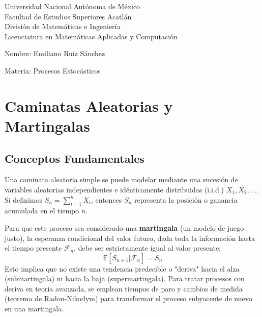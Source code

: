 \documentclass[12pt, a4paper]{article}
\begin{document}
\begin{titlepage}
    \centering
    \vspace{1cm}
    
    Universidad Nacional Autónoma de México \\
    Facultad de Estudios Superiores Acatlán \\
    División de Matemáticas e Ingeniería \\
    Licenciatura en Matemáticas Aplicadas y Computación \\
    \vspace{1.5cm}
    
    Nombre: Emiliano Ruiz Sánchez \\
    \vspace{1.5cm}
            
    Materia: Procesos Estocásticos \\
        
\end{titlepage}

\newpage


\section{Caminatas Aleatorias y Martingalas}

\subsection{Conceptos Fundamentales}
Una caminata aleatoria simple se puede modelar mediante una sucesión de variables aleatorias independientes e idénticamente distribuidas (i.i.d.) $X_1, X_2, \dots$. Si definimos $S_n = \sum_{i=1}^n X_i$, entonces $S_n$ representa la posición o ganancia acumulada en el tiempo $n$. 

Para que este proceso sea considerado una \textbf{martingala} (un modelo de juego justo), la esperanza condicional del valor futuro, dada toda la información hasta el tiempo presente $\mathcal{F}_n$, debe ser estrictamente igual al valor presente:
$$ \mathbb{E}[S_{n+1} | \mathcal{F}_n] = S_n $$
Esto implica que no existe una tendencia predecible o "deriva" hacia el alza (submartingala) ni hacia la baja (supermartingala). Para tratar procesos con deriva en teoría avanzada, se emplean tiempos de paro y cambios de medida (teorema de Radon-Nikodym) para transformar el proceso subyacente de nuevo en una martingala.
\end{document}
